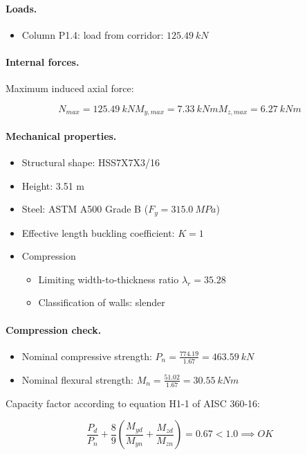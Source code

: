 \paragraph{Loads.}

\begin{itemize}
\item Column P1.4: load from corridor: $125.49\ kN$
\end{itemize}

\paragraph{Internal forces.}

\noindent Maximum induced axial force:

\begin{equation}
  N_{max}= 125.49\ kN
  M_{y,max}= 7.33\ kN m
  M_{z,max}= 6.27\ kN m
\end{equation}

\paragraph{Mechanical properties.}

\begin{itemize}
\item Structural shape: HSS7X7X3/16
\item Height: 3.51 m
\item Steel: ASTM A500 Grade B ($F_y= 315.0\ MPa$)
\item Effective length buckling coefficient: $K= 1$
\item Compression
\begin{itemize}
  \item Limiting width-to-thickness ratio $\lambda_r= 35.28$
  \item Classification of walls: slender
\end{itemize}
\end{itemize}

\paragraph{Compression check.}

\begin{itemize}
\item Nominal compressive strength: $P_n= \frac{774.19}{1.67}= 463.59\ kN$
\item Nominal flexural strength: $M_n= \frac{51.02}{1.67}= 30.55\ kN m$
\end{itemize}

\noindent Capacity factor according to equation H1-1 of AISC 360-16:

\begin{equation}
  \frac{P_d}{P_n}+\frac{8}{9} (\frac{M_{yd}}{M_{yn}}+\frac{M_{zd}}{M_{zn}})= 0.67 < 1.0 \implies OK
  \end{equation}
